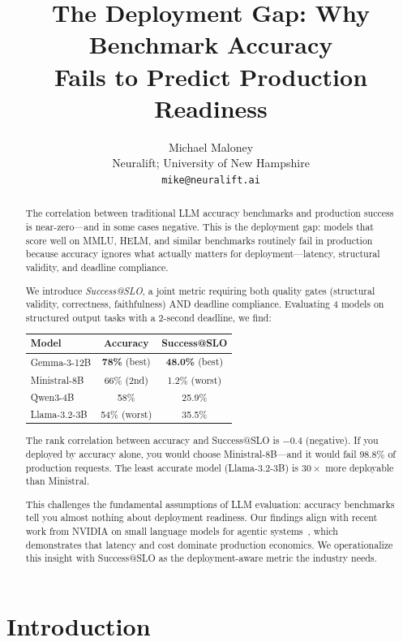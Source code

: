 \documentclass[11pt]{article}
\title{The Deployment Gap: Why Benchmark Accuracy\\Fails to Predict Production Readiness}
\author{
Michael Maloney \\
Neuralift; University of New Hampshire \\
\texttt{mike@neuralift.ai}
}
\date{}
\begin{document}
\maketitle

\begin{abstract}
The correlation between traditional LLM accuracy benchmarks and production success is near-zero---and in some cases negative.
This is the deployment gap: models that score well on MMLU, HELM, and similar benchmarks routinely fail in production because accuracy ignores what actually matters for deployment---latency, structural validity, and deadline compliance.

We introduce \emph{Success@SLO}, a joint metric requiring both quality gates (structural validity, correctness, faithfulness) AND deadline compliance.
Evaluating 4 models on structured output tasks with a 2-second deadline, we find:

\begin{center}
\begin{tabular}{lcc}
\toprule
\textbf{Model} & \textbf{Accuracy} & \textbf{Success@SLO} \\
\midrule
Gemma-3-12B & \textbf{78\%} (best) & \textbf{48.0\%} (best) \\
Ministral-8B & 66\% (2nd) & 1.2\% (worst) \\
Qwen3-4B & 58\% & 25.9\% \\
Llama-3.2-3B & 54\% (worst) & 35.5\% \\
\bottomrule
\end{tabular}
\end{center}

The rank correlation between accuracy and Success@SLO is $-0.4$ (negative).
If you deployed by accuracy alone, you would choose Ministral-8B---and it would fail 98.8\% of production requests.
The least accurate model (Llama-3.2-3B) is $30\times$ more deployable than Ministral.

This challenges the fundamental assumptions of LLM evaluation: accuracy benchmarks tell you almost nothing about deployment readiness.
Our findings align with recent work from NVIDIA on small language models for agentic systems~\citep{nvidia2025slm}, which demonstrates that latency and cost dominate production economics.
We operationalize this insight with Success@SLO as the deployment-aware metric the industry needs.
\end{abstract}

\section{Introduction}
\end{document}
